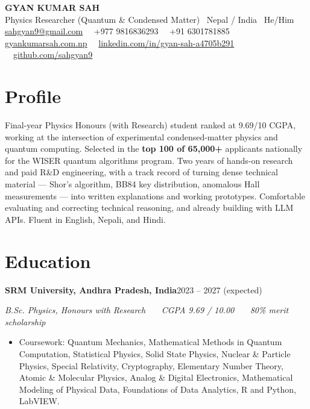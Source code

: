 \documentclass[a4paper,10pt]{article}
\newcommand{\entry}[2]{\textbf{#1}\hfill{\small #2}\par}
\newcommand{\sub}[1]{{\small\itshape #1}\par\vspace{1pt}}
\begin{document}
\begin{center}
    {\LARGE\bfseries GYAN KUMAR SAH}\\[3pt]
    {\small Physics Researcher (Quantum \& Condensed Matter) \textbullet\ Nepal / India \textbullet\ He/Him}\\[3pt]
    {\small
    \href{mailto:sahgyan9@gmail.com}{sahgyan9@gmail.com} \ \textbar\
    +977 9816836293 \ \textbar\ +91 6301781885
    }\\[2pt]
    {\small
    \href{https://www.gyankumarsah.com.np/}{gyankumarsah.com.np} \ \textbar\
    \href{https://www.linkedin.com/in/gyan-sah-a4705b291}{linkedin.com/in/gyan-sah-a4705b291} \ \textbar\
    \href{https://github.com/sahgyan9}{github.com/sahgyan9}
    }
\end{center}

\section*{Profile}
Final-year Physics Honours (with Research) student ranked at 9.69/10 CGPA, working at the intersection of
experimental condensed-matter physics and quantum computing. Selected in the \textbf{top 100 of 65,000+} applicants
nationally for the WISER quantum algorithms program. Two years of hands-on research and paid R\&D engineering, with a
track record of turning dense technical material --- Shor's algorithm, BB84 key distribution, anomalous Hall
measurements --- into written explanations and working prototypes. Comfortable evaluating and correcting technical
reasoning, and already building with LLM APIs. Fluent in English, Nepali, and Hindi.

\section*{Education}

\entry{SRM University, Andhra Pradesh, India}{2023 -- 2027 (expected)}
\sub{B.Sc. Physics, Honours with Research \ \textbar\ \ CGPA 9.69 / 10.00 \ \textbar\ \ 80\% merit scholarship}
\begin{itemize}
    \item Coursework: Quantum Mechanics, Mathematical Methods in Quantum Computation, Statistical Physics,
          Solid State Physics, Nuclear \& Particle Physics, Special Relativity, Cryptography, Elementary Number Theory,
          Atomic \& Molecular Physics, Analog \& Digital Electronics, Mathematical Modeling of Physical Data,
          Foundations of Data Analytics, R and Python, LabVIEW.
\end{itemize}
\end{document}
